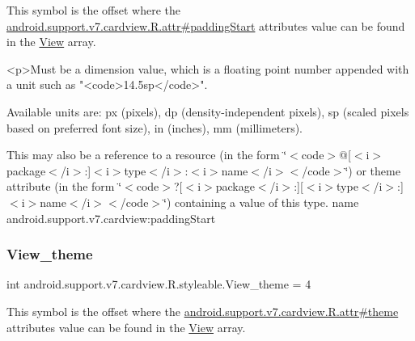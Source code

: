 This symbol is the offset where the \hyperlink{classandroid_1_1support_1_1v7_1_1cardview_1_1R_1_1attr_ab0808b4220876c60ce26172cd57804f6}{android.\+support.\+v7.\+cardview.\+R.\+attr\#padding\+Start} attribute\textquotesingle{}s value can be found in the \hyperlink{classandroid_1_1support_1_1v7_1_1cardview_1_1R_1_1styleable_a25c91e78e53c1aa0141b94584e88b486}{View} array.

\begin{DoxyVerb}      <p>Must be a dimension value, which is a floating point number appended with a unit such as "<code>14.5sp</code>".
\end{DoxyVerb}
 Available units are\+: px (pixels), dp (density-\/independent pixels), sp (scaled pixels based on preferred font size), in (inches), mm (millimeters). 

This may also be a reference to a resource (in the form \char`\"{}$<$code$>$@\mbox{[}$<$i$>$package$<$/i$>$\+:\mbox{]}$<$i$>$type$<$/i$>$\+:$<$i$>$name$<$/i$>$$<$/code$>$\char`\"{}) or theme attribute (in the form \char`\"{}$<$code$>$?\mbox{[}$<$i$>$package$<$/i$>$\+:\mbox{]}\mbox{[}$<$i$>$type$<$/i$>$\+:\mbox{]}$<$i$>$name$<$/i$>$$<$/code$>$\char`\"{}) containing a value of this type.  name android.\+support.\+v7.\+cardview\+:padding\+Start \mbox{\label{classandroid_1_1support_1_1v7_1_1cardview_1_1R_1_1styleable_a7152ff8c1f1b8c910d28540824081033}} 
\subsubsection{\texorpdfstring{View\+\_\+theme}{View\_theme}}
{\footnotesize\ttfamily int android.\+support.\+v7.\+cardview.\+R.\+styleable.\+View\+\_\+theme = 4\hspace{0.3cm}{\ttfamily [static]}}

This symbol is the offset where the \hyperlink{classandroid_1_1support_1_1v7_1_1cardview_1_1R_1_1attr_aae85a62e5df536faad431dd28ed3e990}{android.\+support.\+v7.\+cardview.\+R.\+attr\#theme} attribute\textquotesingle{}s value can be found in the \hyperlink{classandroid_1_1support_1_1v7_1_1cardview_1_1R_1_1styleable_a25c91e78e53c1aa0141b94584e88b486}{View} array.

